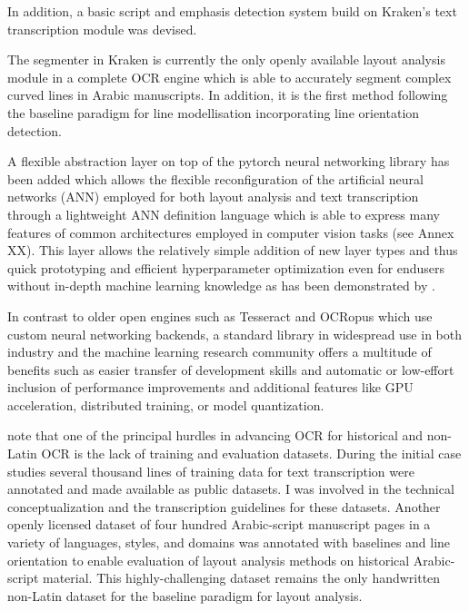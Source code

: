In addition, a basic script and emphasis detection system build on Kraken's
text transcription module was devised. 

The segmenter in Kraken is currently the only openly available layout analysis
module in a complete OCR engine which is able to accurately segment complex
curved lines in Arabic manuscripts. In addition, it is the first method
following the baseline paradigm for line modellisation incorporating line
orientation detection. 

A flexible abstraction layer on top of the pytorch neural networking library
has been added which allows the flexible reconfiguration of the artificial
neural networks (ANN) employed for both layout analysis and text transcription 
through a lightweight ANN definition language which is able to express many
features of common architectures employed in computer vision tasks (see Annex
XX). This layer allows the relatively simple addition of new layer types and
thus quick prototyping and efficient hyperparameter optimization even for
endusers without in-depth machine learning knowledge as has been demonstrated
by \cite{strobel2020much}. 

In contrast to older open engines such as Tesseract and OCRopus which use
custom neural networking backends, a standard library in widespread use in both
industry and the machine learning research community offers a multitude of
benefits such as easier transfer of development skills and automatic or
low-effort inclusion of performance improvements and additional features like
GPU acceleration, distributed training, or model quantization.

\cite[pg. 19]{smith2018research} note that one of the principal hurdles in
advancing OCR for historical and non-Latin OCR is the lack of training and
evaluation datasets. During the initial case studies several thousand lines of
training data for text transcription were annotated and made available as public
datasets. I was involved in the technical conceptualization and the
transcription guidelines for these datasets. Another openly licensed dataset of
four hundred Arabic-script manuscript pages in a variety of languages, styles,
and domains was annotated with baselines and line orientation to enable
evaluation of layout analysis methods on historical Arabic-script material.
This highly-challenging dataset remains the only handwritten non-Latin dataset
for the baseline paradigm for layout analysis.

